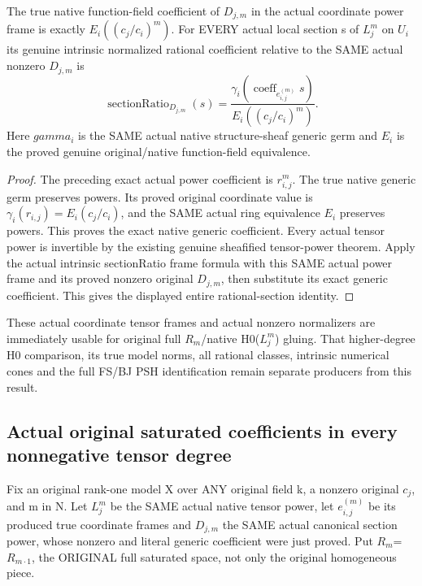 \begin{theorem}
\label{thm:seven-native-coordinate-tensor-rational-coefficients}
\leanok
The true native function-field coefficient of $D_{j,m}$ in the actual
coordinate power frame is exactly $E_i((c_j/c_i)^m)$. For EVERY actual local
section s of $L_j^m$ on $U_i$ its genuine intrinsic normalized rational
coefficient relative to the SAME actual nonzero $D_{j,m}$ is
\[
 \operatorname{sectionRatio}_{D_{j,m}}(s)
 =\frac{\gamma_i(\operatorname{coeff}_{e_{i,j}^{(m)}}s)}
 {E_i((c_j/c_i)^m)}.
\]
Here $gamma_i$ is the SAME actual native structure-sheaf generic germ and $E_i$
is the proved genuine original/native function-field equivalence.
\end{theorem}
\begin{proof}
The preceding exact actual power coefficient is $r_{i,j}^m$. The true native
generic germ preserves powers. Its proved original coordinate
value is $\gamma_i(r_{i,j})=E_i(c_j/c_i)$, and the SAME actual ring
equivalence $E_i$ preserves powers. This proves the exact native generic
coefficient. Every actual tensor power is invertible by the existing
genuine sheafified tensor-power theorem. Apply the actual intrinsic
sectionRatio frame formula with this SAME actual power frame and its
proved nonzero original $D_{j,m}$, then substitute its exact generic
coefficient. This gives the displayed entire rational-section identity.
\end{proof}

\begin{remark}
These actual coordinate tensor frames and actual nonzero normalizers are
immediately usable for original full $R_m$/native H0($L_j^m$) gluing. That
higher-degree H0 comparison, its true model norms, all rational classes,
intrinsic numerical cones and the full FS/BJ PSH identification remain
separate producers from this result.
\end{remark}

\subsection{Actual original saturated coefficients in every nonnegative tensor degree}
Fix an original rank-one model X over ANY original field k, a nonzero
original $c_j$, and m in N. Let $L_j^m$ be the SAME actual native tensor power,
let $e_{i,j}^{(m)}$ be its produced true coordinate frames and $D_{j,m}$ the
SAME actual canonical section power, whose nonzero and literal generic
coefficient were just proved. Put $R_m$=$R_{m\cdot1}$, the ORIGINAL full
saturated space, not only the original homogeneous piece.

